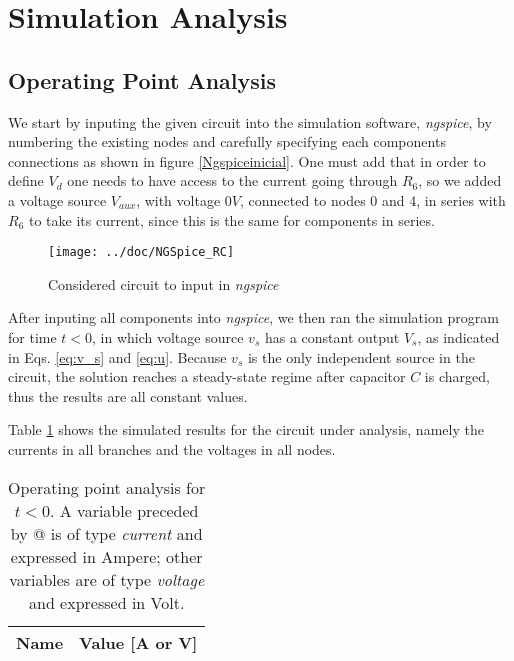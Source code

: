 \section{Simulation Analysis}
\label{sec:simulation}

\subsection{Operating Point Analysis}

We start by inputing the given circuit into the simulation software, \emph{ngspice}, by numbering the existing nodes and carefully specifying each components connections as shown in figure \ref{Ngspiceinicial}.
One must add that in order to define $V_d$ one needs to have access to the current going through $R_6$, so we added a voltage source $V_{aux}$, with voltage $0V$, connected to nodes 0 and 4, in series with $R_6$ to take its current, since this is the same for components in series.

\begin{figure}[H]
  \centering
  \texttt{[image: ../doc/NGSpice\_RC]}
  \caption{Considered circuit to input in \emph{ngspice}}
  \label{fig:fignodos}
\end{figure}

After inputing all components into \emph{ngspice}, we then ran the simulation program for time $t<0$, in which voltage source $v_s$ has a constant output $V_s$, as indicated in Eqs. \ref{eq:v_s} and \ref{eq:u}. Because $v_s$ is the only independent source in the circuit, the solution reaches a steady-state regime after capacitor $C$ is charged, thus the results are all constant values.


Table \ref{tab:ngspice_1} shows the simulated results for the circuit
under analysis, namely the currents in all branches and the voltages in all nodes.
\begin{multicols}{2}

\begin{table}[H]
  \centering
  \begin{tabular}{|l|r|}
    \hline
    {\bf Name} & {\bf Value [A or V]} \\ \hline
  \end{tabular}
  \caption{Operating point analysis for $t<0$. A variable preceded by @ is of type {\em current}
    and expressed in Ampere; other variables are of type {\it voltage} and expressed in
    Volt.}
  \label{tab:ngspice_1}
\end{table}

\end{multicols}

